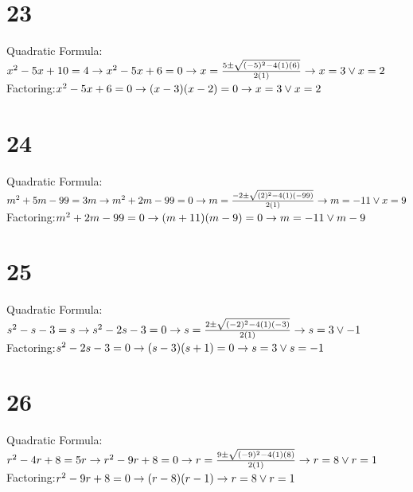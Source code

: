 \documentclass{article}
\theoremstyle{definition}
\begin{document}
\section*{23}
Quadratic Formula:\newline $x^2-5x+10=4\newline\rightarrow x^2-5x+6=0\newline\rightarrow x=\frac{5\pm\sqrt{(-5)^2-4(1)(6)}}{2(1)}\newline\rightarrow 
x=3\vee x=2$\newline
Factoring:\newline $x^2-5x+6=0\newline\rightarrow (x-3)(x-2)=0\newline\rightarrow x=3\vee x=2$

\section*{24}
Quadratic Formula:\newline $m^2+5m-99=3m\newline\rightarrow m^2+2m-99=0\newline\rightarrow m=\frac{-2\pm\sqrt{(2)^2-4(1)(-99)}}{2(1)}\newline\rightarrow 
m=-11\vee x=9$\newline
Factoring:\newline $m^2+2m-99=0\newline\rightarrow (m+11)(m-9)=0\newline\rightarrow m=-11\vee m-9$ 

\section*{25}
Quadratic Formula:\newline
$s^2-s-3=s\newline\rightarrow s^2-2s-3=0\newline\rightarrow s=\frac{2\pm\sqrt{(-2)^2-4(1)(-3)}}{2(1)}\newline\rightarrow s=3\vee -1$\newline
Factoring:\newline $s^2-2s-3=0\newline\rightarrow (s-3)(s+1)=0\newline\rightarrow s=3\vee s=-1$

\section*{26}
Quadratic Formula:\newline 
$r^2-4r+8=5r\newline\rightarrow r^2-9r+8=0\newline\rightarrow r=\frac{9\pm\sqrt{(-9)^2-4(1)(8)}}{2(1)}\newline\rightarrow r=8\vee r=1$\newline
Factoring:\newline $r^2-9r+8=0\newline\rightarrow (r-8)(r-1)\newline\rightarrow r=8\vee r=1$
\end{document}
